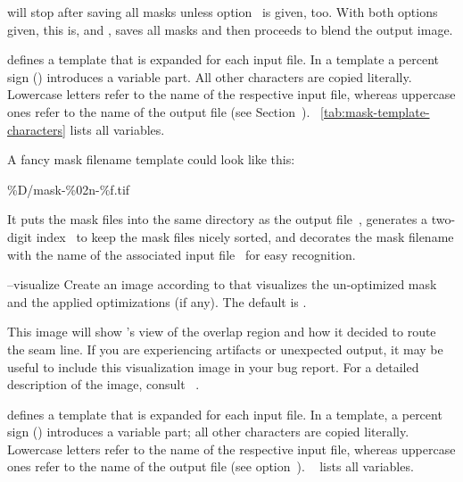 \begin{codelist}
  \begin{sloppypar}
    \App{} will stop after saving all masks unless
    option~ is given, too.  With both options given,
    this is,  and , \App{} saves all masks and then
    proceeds to blend the output image.
  \end{sloppypar}

  \begin{geeknote}
     defines a template that is expanded for each input file.  In a
    template a percent sign (\sample{\%}) introduces a variable part.  All other characters are
    copied literally.  Lowercase letters refer to the name of the respective input file, whereas
    uppercase ones refer to the name of the output file (see
    Section~).  \tableName~\ref{tab:mask-template-characters} lists
    all variables.

    A fancy mask filename template could look like this:

    \begin{literal}
      \%D/mask-\%02n-\%f.tif
    \end{literal}

    It puts the mask files into the same directory as the output file~, generates a
    two-digit index~ to keep the mask files nicely sorted, and decorates the mask
    filename with the name of the associated input file~ for easy recognition.
  \end{geeknote}


  \label{opt:visualize}%
\item[--visualize\optional{=\metavar{VISUALIZE-TEMPLATE}}]\itemend
  Create an image according to  that visualizes the un-optimized
  mask and the applied optimizations (if any).  The default is
  \mbox{}.

  This image will show \App{}'s view of the overlap region and how it decided to route the seam
  line.  If you are experiencing artifacts or unexpected output, it may be useful to include
  this visualization image in your bug report.  For a detailed description of the image, consult
  \chapterName~.

  \begin{geeknote}
     defines a template that is expanded for each input file.  In a
    template, a percent sign (\sample{\%}) introduces a variable part; all other characters are
    copied literally.  Lowercase letters refer to the name of the respective input file, whereas
    uppercase ones refer to the name of the output file (see
    option~).
    \tableName~ lists all variables.
  \end{geeknote}
\end{codelist}







